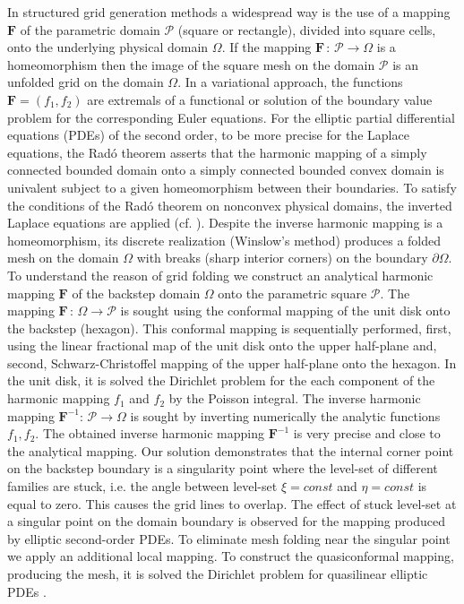 In structured grid generation methods a widespread way is the use of a mapping $\mathbf F$ of the parametric domain $\mathcal P$ (square or rectangle), divided into square cells, onto the underlying physical domain $\Omega$. If the mapping $\mathbf F\,{:}\,\mathcal P{\rightarrow}\Omega$ is a homeomorphism then the image of the square mesh on the domain $\mathcal P$ is an unfolded grid on the domain $\Omega$. In a variational approach, the functions $\mathbf F{=}(f_1,f_2)$ are extremals of a functional or solution of the boundary value problem for the corresponding Euler equations. For the elliptic partial differential equations (PDEs) of the second order, to be more precise for the Laplace equations, the Rad\'o theorem \cite{Rado26} asserts that the harmonic mapping of a simply connected bounded domain onto a simply connected bounded convex domain is univalent subject to a given homeomorphism between their boundaries. To satisfy the conditions of the Rad\'o theorem on nonconvex physical domains, the inverted Laplace equations are applied (cf. \cite{Winslow67,Thomp74}). Despite the inverse harmonic mapping is a homeomorphism, its discrete realization (Winslow's method) produces a folded mesh on the domain $\Omega$ with breaks (sharp interior corners) on the boundary $\partial\Omega$. To understand the reason of grid folding we construct an analytical harmonic mapping $\mathbf F$ of the backstep domain $\Omega$ onto the parametric square $\mathcal P$. The mapping $\mathbf F\,{:}\,\Omega{\rightarrow}\mathcal P$ is sought using the conformal mapping of the unit disk onto the backstep (hexagon). This conformal mapping is sequentially performed, first, using the linear fractional map of the unit disk onto the upper half-plane and, second, Schwarz-Christoffel mapping of the upper half-plane onto the hexagon. In the unit disk, it is solved the Dirichlet problem for the each component of the harmonic mapping $f_1$ and $f_2$ by the Poisson integral. The inverse harmonic mapping $\mathbf F^{-1}{:}\,\mathcal P{\rightarrow}\Omega$ is sought by inverting numerically the analytic functions $f_1,f_2$. The obtained inverse harmonic mapping $\mathbf F^{-1}$ is very precise and close to the analytical mapping. Our solution demonstrates that the internal corner point on the backstep boundary is a singularity point where the level-set of different families are stuck, i.e. the angle between level-set $\xi{=}const$ and  $\eta{=}const$ is equal to zero. This causes the grid lines to overlap. The effect of stuck level-set at a singular point on the domain boundary is observed for the mapping produced by elliptic second-order PDEs. To eliminate mesh folding near the singular point we apply an additional local mapping. To construct the quasiconformal mapping, producing the mesh, it is solved the Dirichlet problem for quasilinear elliptic PDEs \cite{Azar09}.


